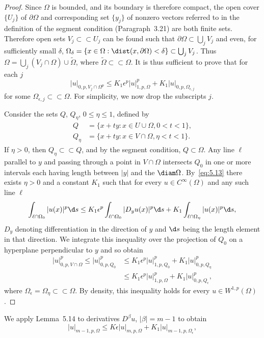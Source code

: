 \begin{proof}
  Since $\Omega$ is bounded, and its boundary is therefore compact, the open
  cover $\{U_j\}$ of $\partial\Omega$ and corresponding set $\{y_j\}$ of
  nonzero vectors referred to in the definition of the segment condition
  (Paragraph~3.21) are both finite sets. Therefore open sets $V_j\subset\subset U_j$
  can be found such that $\partial\Omega\subset\bigcup_j V_j$ and even,
  for sufficiently small $\delta$, $\Omega_\delta = \{x\in\Omega : \dist(x,\partial\Omega)<\delta\}
  \subset \bigcup_j V_j$. Thus $\Omega = \bigcup_j (V_j\cap\Omega)\cup\tilde{\Omega}$,
  where $\tilde{\Omega}\subset\subset\Omega$. It is thus sufficient
  to prove that for each $j$
  \[ |u|_{0,p,V_j\cap\Omega^p} \leq K_1 \epsilon^p |u|_{1,p,\Omega}^p
      + K_1 |u|_{0,p,\Omega_{\epsilon,j}} \]
  for some $\Omega_{\epsilon,j}\subset\subset\Omega$. For simplicity,
  we now drop the subscripts $j$.

  Consider the sets $Q$, $Q_\eta$, $0\leq\eta\leq 1$, defined by
  \begin{align*}
    Q & = \{x+ty : x\in U\cup\Omega, 0<t<1\}, \\
    Q_\eta & = \{x+ty : x\in V\cap\Omega, \eta<t<1\}.
  \end{align*}
  If $\eta>0$, then $Q_\eta\subset\subset Q$, and by the segment condition,
  $Q\subset\Omega$. Any line $\ell$ parallel to $y$ and passing through
  a point in $V\cap\Omega$ intersects $Q_0$ in one or more intervals
  each having length between $|y|$ and the $\diam\Omega$. By~\eqref{eq:5.13}
  there exists $\eta>0$ and a constant $K_1$ such that for every $u\in C^\infty(\Omega)$
  and any such line $\ell$
  \[ \int_{\ell\cap\Omega_0} |u(x)|^p \d s
      \leq K_1 \epsilon^p \int_{\ell\cap\Omega_0} |D_y u(x)|^p \d s
      + K_1 \int_{\ell\cap\Omega_\eta} |u(x)|^p \d s, \]
  $D_y$ denoting differentiation in the direction of $y$ and $\d s$ being the
  length element in that direction. We integrate this inequality over the
  projection of $Q_0$ on a hyperplane perpendicular to $y$ and so obtain
  \begin{align*}
    |u|_{0,p,V\cap\Omega}^p \leq |u|_{0,p,Q_0}^p
    & \leq K_1 \epsilon^p |u|_{1,p,Q_0}^p + K_1 |u|_{0,p,Q_\eta}^p \\
    & \leq K_1 \epsilon^p |u|_{1,p,\Omega}^p + K_1 |u|_{0,p,Q_\epsilon}^p,
  \end{align*}
  where $\Omega_\epsilon = \Omega_\eta \subset\subset\Omega$.
  By density, this inequality holds for every $u\in W^{1,p}(\Omega)$.
\end{proof}


\begin{para}
  We apply Lemma~5.14 to derivatives $D^\beta u$, $|\beta|=m-1$ to obtain
  \begin{equation}\label{eq:5.19}
    |u|_{m-1,p,\Omega} \leq K\epsilon |u|_{m,p,\Omega} + K_1 |u|_{m-1,p,\Omega_\epsilon},
  \end{equation}
\end{para}